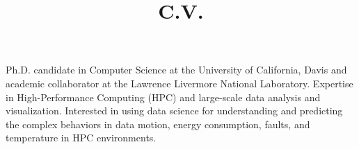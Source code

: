 \documentclass[11pt,a4paper,sans]{moderncv}        %
\title{C.V.}
\begin{document}
\makecvtitle

\small{Ph.D. candidate in Computer Science at the University of California, Davis and academic collaborator at the Lawrence Livermore National Laboratory. Expertise in High-Performance Computing (HPC) and large-scale data analysis and visualization. Interested in using data science for understanding and predicting the complex behaviors in data motion, energy consumption, faults, and temperature in HPC environments.}






\end{document}
